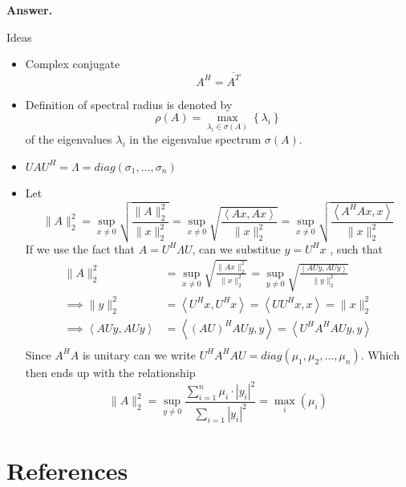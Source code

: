 \documentclass{article}
\theoremstyle{remark}
\newcommand{\newpara}
  {
  \vskip 0.4cm
  }
\begin{document}
\newpara
  \textbf{Answer.} 
  \newpara Ideas
  \begin{itemize}
    \item Complex conjugate \[
     A^{H} = \overline{A^{T}} 
    \] 
    \item  Definition of spectral radius is denoted by \[
        \rho \left( A \right) = \max_{\lambda _{i} \in  \sigma \left( A \right)} \left\{ \lambda _{i} \right\}
    \] 
    of the eigenvalues $\lambda _{i}$ in the eigenvalue spectrum $\sigma \left( A \right)$.
  
\item $UAU^{H}  = \Lambda = diag\left( \sigma _{1} , \ldots , \sigma _{n} \right) $ 
\item  Let \[
\|A\|_{2}^{2} = \sup _{x\neq 0} \sqrt{\frac{\|A \|_{2}^{2}}{\|x\|_{2}^{2}}}  = \sup _{x \neq 0} \sqrt{\frac{\left< Ax , Ax \right>}{\|x\|_{2}^{2}}}   = \sup _{x \neq 0} \sqrt{\frac{\left<A^{H} Ax ,x \right>}{\|x\|_{2}^{2}} }  
\]  
If we use the fact that $A = U^{H} \Lambda  U$, can we substitue $y = U^{H} x$ , such that  \[
  \begin{split}
\|A\|_{2}^{2}  & = \sup _{x \neq 0} \sqrt{\frac{\|Ax \|_{2}^{2}}{  \|x\|_{2}^{2}}}  = \sup _{y \neq 0} \sqrt{\frac{\left< AU y, AU y\right>}{ \|y\|_{2}^{2}}}  \\
 \implies  \|y\|_{2}^{2}  & = \left<U^{H} x, U^{H} x \right> =  \left< U U^{H} x,x \right>  = \|x\|_{2}^{2} \\
\implies  \left<AUy, AUy \right> &=  \left<\left( AU \right)^{H} AU y , y \right> = \left<U^{H} A^{H} AU y, y \right> \\
  \end{split} 
\] 
Since $A^{H} A$ is unitary can we write $U^{H} A^{H} A U = diag (\mu _{1} , \mu _{2} , \ldots, \mu _{n} )$.   Which then ends up with the relationship \[
\|A\|_{2}^{2} = \sup_{y \neq 0 }  \frac{\sum_{i=1}^{n} \mu _{i} \cdot \left| y_{i} \right|^{2} }{ \sum_{i=1}^{}  \left\lvert y_{i} \right\rvert^{2} } =  \max_{i} \left( \mu _{i} \right) 
\] 
  
  \end{itemize}




\newpage
\section{References}%
\label{sec:references}



\end{document}

